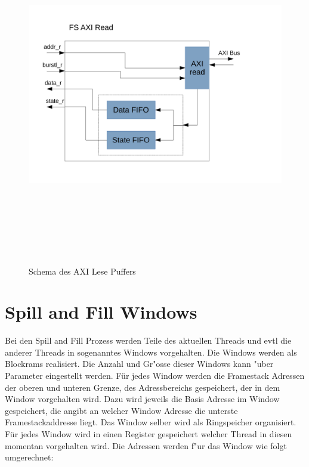 \begin{figure}
	\centering
	\includegraphics[height = 15cm]{PS_RS_graphics/Axi Read Buffer.pdf}
	\caption{Schema des AXI Lese Puffers}
\end{figure}

\section{Spill and Fill Windows}

Bei den Spill and Fill Prozess werden Teile des aktuellen Threads  und evtl die anderer Threads in sogenanntes Windows vorgehalten. Die Windows werden als Blockrams realisiert. 
Die Anzahl und Gr"o{ss}e dieser Windows kann "uber Parameter eingestellt werden. Für jedes Window werden die Framestack Adressen der oberen und unteren Grenze, des Adressbereichs gespeichert, der in dem Window vorgehalten wird. Dazu wird jeweils die Basis Adresse im Window gespeichert, die angibt an welcher Window Adresse die unterste Framestackaddresse liegt. 
Das Window selber wird als Ringspeicher organisiert. Für jedes Window wird in einen Register gespeichert welcher Thread in diesen momentan vorgehalten wird. 
Die Adressen werden f"ur das Window wie folgt umgerechnet:

